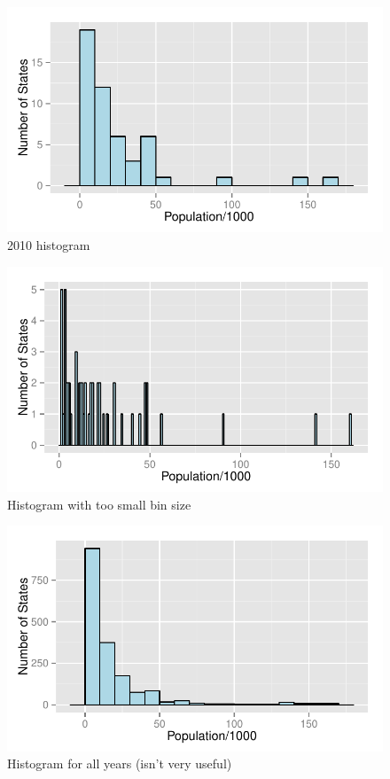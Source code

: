 \documentclass[letterpaper, landscape]{article}
\begin{document}
  \begin{figure}[H]
    \centering
    \includegraphics[scale = 0.8]{figures/population_histogram_2010.pdf}
    \caption{2010 histogram}
  \end{figure}

  \begin{figure}[H]
    \centering
    \includegraphics[scale = 0.8]{figures/population_histogram_2010_small_bins.pdf}
    \caption{Histogram with too small bin size}
  \end{figure}

  \begin{figure}[H]
    \centering
    \includegraphics[scale = 0.8]{figures/population_histogram_1978_2010.pdf}
    \caption{Histogram for all years (isn't very useful)}
  \end{figure}
\end{document}
